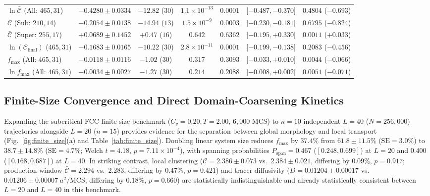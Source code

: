 \documentclass[aps,pre,reprint,superscriptaddress,amsmath,amssymb,floatfix]{revtex4-2}
\begin{document}
\begin{table}[t]
\begin{ruledtabular}
\begin{tabular}{lcccccc}
$\ln\bar{\mathcal{C}}$ (All: $465, 31$)  & $-0.4280 \pm 0.0334$ & $-12.82$ ($30$) & $1.1{\times}10^{-13}$ & $0.0001$ & [$-0.487,-0.370$] & $0.4804$ ($-0.693$) \\
$\bar{\mathcal{C}}$ (Sub: $210, 14$)     & $-0.2054 \pm 0.0138$ & $-14.94$ ($13$) & $1.5{\times}10^{-9}$  & $0.0003$ & [$-0.230,-0.181$] & $0.6795$ ($-0.824$) \\
$\bar{\mathcal{C}}$ (Super: $255, 17$)   & $+0.0689 \pm 0.1452$ & $+0.47$ ($16$)  & $0.642$ & $0.6362$ & [$-0.195,+0.330$] & $0.0011$ ($+0.033$) \\
$\ln(\mathcal{C}_{\mathrm{final}})$ ($465, 31$)& $-0.1683 \pm 0.0165$ & $-10.22$ ($30$) & $2.8{\times}10^{-11}$ & $0.0001$ & [$-0.199,-0.138$] & $0.2083$ ($-0.456$) \\
$f_{\max}$ (All: $465, 31$)              & $-0.0118 \pm 0.0116$ & $-1.02$ ($30$)  & $0.317$ & $0.3093$ & [$-0.033,+0.010$] & $0.0044$ ($-0.066$) \\
$\ln f_{\max}$ (All: $465, 31$)          & $-0.0034 \pm 0.0027$ & $-1.27$ ($30$)  & $0.214$ & $0.2088$ & [$-0.008,+0.002$] & $0.0051$ ($-0.071$) \\
\end{tabular}
\end{ruledtabular}
\endgroup
\end{table}

\subsection{Finite-Size Convergence and Direct Domain-Coarsening Kinetics}
\label{sec:finite_size}

Expanding the subcritical FCC finite-size benchmark ($C_v = 0.20, T = 2.00$, $6{,}000$ MCS) to $n = 10$ independent $L = 40$ ($N = 256{,}000$) trajectories alongside $L = 20$ ($n = 15$) provides evidence for the separation between global morphology and local transport (Fig.~\ref{fig:finite_size}(a) and Table~\ref{tab:finite_size}). Doubling linear system size reduces $f_{\max}$ by $37.4\%$ from $61.8 \pm 11.5\%$ ($\mathrm{SE} = 3.0\%$) to $38.7 \pm 14.8\%$ ($\mathrm{SE} = 4.7\%$; Welch $t = 4.18$, $p = 7.11 \times 10^{-4}$), with spanning probabilities $P_{\mathrm{span}} = 0.467$ ($[0.248, 0.699]$) at $L = 20$ and $0.400$ ($[0.168, 0.687]$) at $L = 40$. In striking contrast, local clustering ($\mathcal{C} = 2.386 \pm 0.073$ vs.\ $2.384 \pm 0.021$, differing by $0.09\%$, $p = 0.917$; production-window $\bar{\mathcal{C}} = 2.294$ vs.\ $2.283$, differing by $0.47\%$, $p = 0.421$) and tracer diffusivity ($D = 0.01204 \pm 0.00017$ vs.\ $0.01206 \pm 0.00007\;a^2/\mathrm{MCS}$, differing by $0.18\%$, $p = 0.660$) are statistically indistinguishable and already statistically consistent between $L=20$ and $L=40$ in this benchmark.
\end{document}
